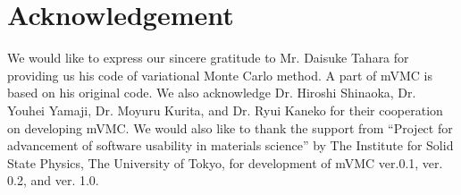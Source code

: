 \chapter{Acknowledgement}
\label{Ch:ack}
We would like to express our sincere gratitude to Mr. Daisuke Tahara
for providing us his code of variational Monte Carlo method.
A part of mVMC is based on his original code.
We also acknowledge Dr. Hiroshi Shinaoka, Dr. Youhei Yamaji, 
Dr. Moyuru Kurita, and Dr. Ryui Kaneko for their cooperation on developing mVMC.
We would also like to thank the support from “Project for advancement of software 
usability in materials science” by The Institute for Solid State Physics, 
The University of Tokyo, for development of mVMC ver.0.1, ver. 0.2, and ver. 1.0. 
